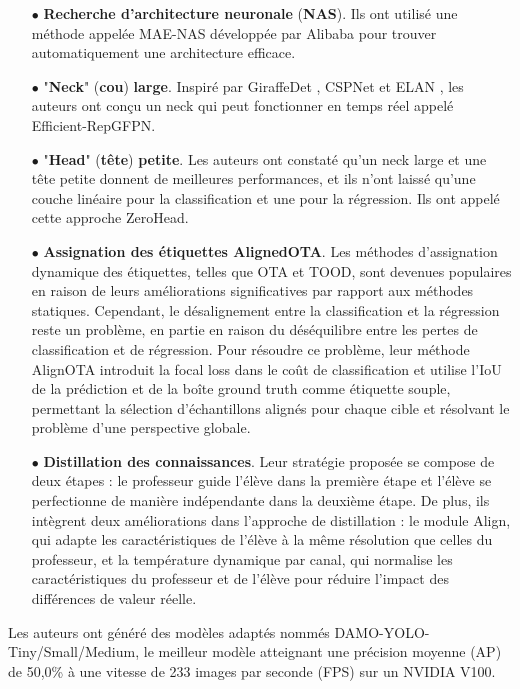 \documentclass{article}
\begin{document}
\begin{itemize}
    \item[$\bullet$] \textbf{Recherche d'architecture neuronale} (\textbf{NAS}). Ils ont utilisé une méthode appelée MAE-NAS \cite{98} développée par Alibaba pour trouver automatiquement une architecture efficace.
    \item[$\bullet$] "\textbf{Neck}" (\textbf{cou}) \textbf{large}. Inspiré par GiraffeDet \cite{99}, CSPNet \cite{61} et ELAN \cite{95}, les auteurs ont conçu un neck qui peut fonctionner en temps réel appelé Efficient-RepGFPN.
    \item[$\bullet$] "\textbf{Head}" (\textbf{tête}) \textbf{petite}. Les auteurs ont constaté qu'un neck large et une tête petite donnent de meilleures performances, et ils n'ont laissé qu'une couche linéaire pour la classification et une pour la régression. Ils ont appelé cette approche ZeroHead.
    \item[$\bullet$] \textbf{Assignation des étiquettes AlignedOTA}. Les méthodes d'assignation dynamique des étiquettes, telles que OTA\cite{84} et TOOD\cite{88}, sont devenues populaires en raison de leurs améliorations significatives par rapport aux méthodes statiques. Cependant, le désalignement entre la classification et la régression reste un problème, en partie en raison du déséquilibre entre les pertes de classification et de régression. Pour résoudre ce problème, leur méthode AlignOTA introduit la focal loss \cite{75} dans le coût de classification et utilise l'IoU de la prédiction et de la boîte ground truth comme étiquette souple, permettant la sélection d'échantillons alignés pour chaque cible et résolvant le problème d'une perspective globale.
    \item[$\bullet$] \textbf{Distillation des connaissances}. Leur stratégie proposée se compose de deux étapes : le professeur guide l'élève dans la première étape et l'élève se perfectionne de manière indépendante dans la deuxième étape. De plus, ils intègrent deux améliorations dans l'approche de distillation : le module Align, qui adapte les caractéristiques de l'élève à la même résolution que celles du professeur, et la température dynamique par canal, qui normalise les caractéristiques du professeur et de l'élève pour réduire l'impact des différences de valeur réelle.
\end{itemize}

Les auteurs ont généré des modèles adaptés nommés DAMO-YOLO-Tiny/Small/Medium, le meilleur modèle atteignant une précision moyenne (AP) de 50,0\% à une vitesse de 233 images par seconde (FPS) sur un NVIDIA V100.
\end{document}
